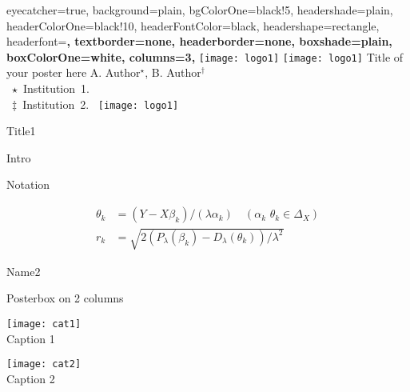 \documentclass[landscape, a0paper]{baposter}
\begin{document}
\begin{poster}{
    eyecatcher=true,
    background=plain,
    bgColorOne=black!5,
    headershade=plain,
    headerColorOne=black!10,
    headerFontColor=black,
    headershape=rectangle,
    headerfont=\LARGE\bf,
    textborder=none,
    headerborder=none,
    boxshade=plain,
    boxColorOne=white,
    columns=3,
}
{
\texttt{[image: logo1]}
\texttt{[image: logo1]}
}
{
Title of your poster here
}
{
    A. Author${}^\star$,
    B. Author${}^\dagger$ \\
   \mbox{
        $\star$ Institution 1.
        }\\
   \mbox{
        $\ddagger$ Institution 2.
        }
}
{
\texttt{[image: logo1]}
}

\begin{posterbox}[name=name1, column=1]{Title1}

\lipsum[1-2]
\end{posterbox}



\begin{posterbox}[name=intro, column=0, bottomaligned=name1]{Intro}
  \lipsum[4]
\end{posterbox}

\begin{posterbox}[name=notation, column=0, below=name1,height=bottom]{Notation}

  \begin{align*}
        \theta_k &= (Y - X \beta_k) / (\lambda \alpha_k) \quad (\alpha_k \,\, \theta_k \in \Delta_X)
        \\r_k&=\sqrt{2 (P_\lambda(\beta_k) - D_\lambda(\theta_k))/ \lambda^2}
  \end{align*}

\end{posterbox}






\begin{posterbox}[name=name2, column=2, bottomaligned=name1]{Name2}

    \lipsum[1]

\end{posterbox}


\begin{posterbox}[name=name3, column=1, span=2, below=intro
                  ]{Posterbox on 2 columns}

  \begin{minipage}{0.47\linewidth}%
  \centering
      \texttt{[image: cat1]}\\%
  Caption 1
  \end{minipage}%
%
  \begin{minipage}{10px}\end{minipage}
  \begin{minipage}{0.47\linewidth}%
  \centering
      \texttt{[image: cat2]}\\%
  Caption 2
  \end{minipage}%


\end{posterbox}
\end{poster}
\end{document}
